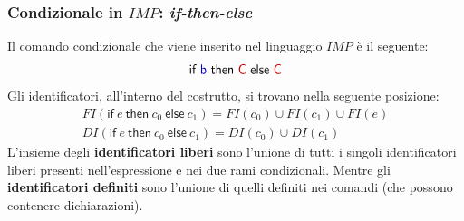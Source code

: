 \documentclass[a4paper]{article}
\begin{document}
 	\subsubsection{Condizionale in $IMP$: \emph{if-then-else}}
 	
 	Il comando condizionale che viene inserito nel linguaggio $IMP$ è il seguente:
 	\begin{equation*}
 		\textsf{if \textcolor{Blue3}{b} then \textcolor{Red3}{C} else \textcolor{Red3}{C}}
 	\end{equation*}
 	Gli identificatori, all'interno del costrutto, si trovano nella seguente posizione:
 	\begin{gather*}
 		FI\left(\mathsf{if} \: e \: \mathsf{then} \: c_{0} \: \mathsf{else} \: c_{1}\right) = FI\left(c_{0}\right) \cup FI\left(c_{1}\right) \cup FI\left(e\right) \\
 		DI\left(\mathsf{if} \: e \: \mathsf{then} \: c_{0} \: \mathsf{else} \: c_{1}\right) = DI\left(c_{0}\right) \cup DI\left(c_{1}\right)
 	\end{gather*}
 	L'insieme degli \textbf{identificatori liberi} sono l'unione di tutti i singoli identificatori liberi presenti nell'espressione e nei due rami condizionali. Mentre gli \textbf{identificatori definiti} sono l'unione di quelli definiti nei comandi (che possono contenere dichiarazioni).\newline
 	
\end{document}
